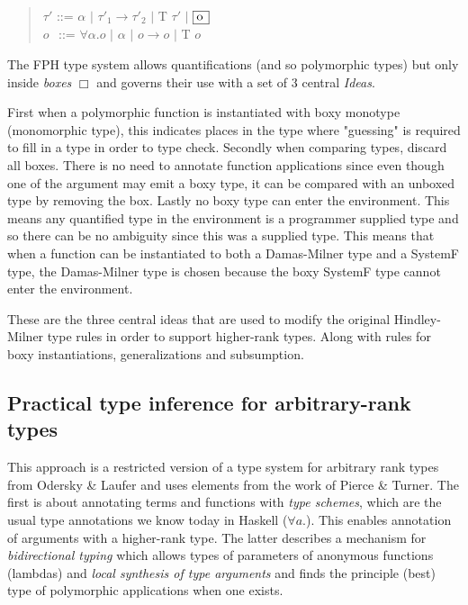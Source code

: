 \documentclass[twoside, titlepage, openright, a4paper]{book}
\begin{document}
\begin{quotation}
$\tau'$ ::= $\alpha$ $|$  $\tau'_1 \rightarrow \tau'_2$ $|$ T $\tau'$ $|$ $\framebox[0.45cm][l]{o}$ \\
\indent $o$ $\hspace{1pt}$ ::= $\forall \alpha.o$ $|$ $\alpha$ $|$ $o \rightarrow o$ $|$ T $o$
\end{quotation}

The FPH type system allows quantifications (and so polymorphic types) but only inside \emph{boxes} $\Box$ and governs their use with a set of 3 central \textit{Ideas}\cite{FPH}.

First when a polymorphic function is instantiated with boxy monotype (monomorphic type), this indicates places in the type where "guessing" is required to fill in a type in order to type check.
Secondly when comparing types, discard all boxes. There is no need to annotate function applications since even though one of the argument may emit a boxy type, it can be compared with an unboxed type by removing the box.
Lastly no boxy type can enter the environment. This means any quantified type in the environment is a programmer supplied type and so there can be no ambiguity since this was a supplied type. This means that when a function can be instantiated to both a Damas-Milner type and a SystemF type, the Damas-Milner type is chosen because the boxy SystemF type cannot enter the environment.

These are the three central ideas that are used to modify the original Hindley-Milner type rules in order to support higher-rank types. Along with rules for boxy instantiations, generalizations and subsumption.

\subsection{Practical type inference for arbitrary-rank types\cite{boring}}
This approach is a restricted version of a type system for arbitrary rank types from Odersky \& Laufer\cite{odesky} and uses elements from the work of Pierce \& Turner\cite{pierce}. The first is about annotating terms and functions with \textit{type schemes}, which are the usual type annotations we know today in Haskell ($\forall a.$). This enables annotation of arguments with a higher-rank type. The latter describes a mechanism for \textit{bidirectional typing} which allows types of parameters of anonymous functions (lambdas) and \textit{local synthesis of type arguments} and finds the principle (best) type of polymorphic applications when one exists.
\end{document}
